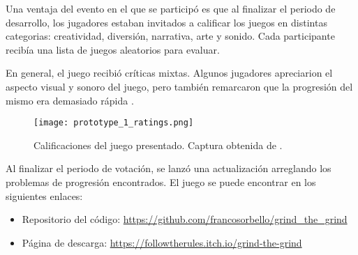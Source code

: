 \par Una ventaja del evento en el que se participó es que al finalizar el periodo de desarrollo, los jugadores estaban invitados a calificar los juegos en distintas categorias: creatividad, diversión, narrativa, arte y sonido. Cada participante recibía una lista de juegos aleatorios para evaluar.
\par En general, el juego recibió críticas mixtas. Algunos jugadores apreciarion el aspecto visual y sonoro del juego, pero también remarcaron que la progresión del mismo era demasiado rápida \cite{GrindGrindFollowtherules}.
\begin{figure}[H]
  \centering
  \texttt{[image: prototype\_1\_ratings.png]}
  \caption{Calificaciones del juego presentado. Captura obtenida de \cite{GrindGrindFollowtherules}.}
  \label{fig:x calificaciones prototipo 1} 
\end{figure}
\par Al finalizar el periodo de votación, se lanzó una actualización arreglando los problemas de progresión encontrados. El juego se puede encontrar en los siguientes enlaces:
\begin{itemize}
  \item Repositorio del código: \url{https://github.com/francosorbello/grind_the_grind}
  \item Página de descarga: \url{https://followtherules.itch.io/grind-the-grind}
\end{itemize} 
%
%
